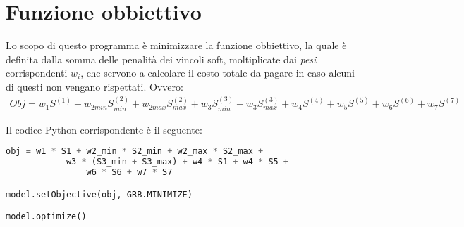 \section{Funzione obbiettivo}
Lo scopo di questo programma è minimizzare la funzione obbiettivo, la quale è definita dalla somma delle penalità dei vincoli soft, moltiplicate dai \textit{pesi} corrispondenti $w_i$, che servono a calcolare il costo totale da pagare in caso alcuni di questi non vengano rispettati. Ovvero:
\begin{gather}
Obj = w_1 S^{(1)} + w_{2min} S^{(2)}_{min} + w_{2max} S^{(2)}_{max} + w_3 S^{(3)}_{min} + w_3 S^{(3)}_{max} + w_4 S^{(4)} + w_5 S^{(5)} + w_6 S^{(6)} + w_7 S^{(7)} 
\end{gather}

Il codice Python corrispondente è il seguente:
\begin{lstlisting}[language=Python]
obj = w1 * S1 + w2_min * S2_min + w2_max * S2_max + 
			w3 * (S3_min + S3_max) + w4 * S1 + w4 * S5 + 
				w6 * S6 + w7 * S7

model.setObjective(obj, GRB.MINIMIZE)

model.optimize()
\end{lstlisting}





